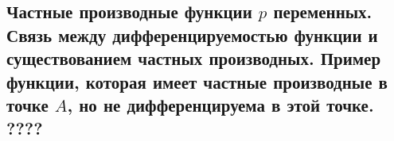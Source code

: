 {
\subsection{Частные производные функции \(p\) переменных. Связь между дифференцируемостью функции и существованием частных производных. Пример функции, которая имеет частные производные в точке \( A \), но не дифференцируема в этой точке. ????} 
}